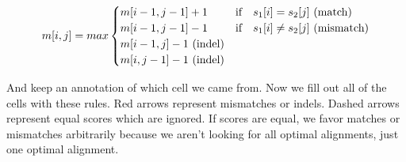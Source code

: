 \documentclass[11pt]{article}
\begin{document}
\begin{equation*}
m[i,j] = max
\begin{cases}
      m[i-1,j-1] + 1 & \text{if \,\, } s_1[i] = s_2[j] \text{ (match)} \\
      m[i-1,j-1] - 1 &  \text{if \,\, } s_1[i] \neq s_2[j] \text{ (mismatch)} \\
      m[i-1,j] - 1 \text{ (indel)} \\
      m[i,j-1] - 1 \text{ (indel)} \\
\end{cases}
\end{equation*}

\noindent
And keep an annotation of which cell we came from. Now we fill out all of the cells with these rules. Red arrows represent mismatches or indels. Dashed arrows represent equal scores which are ignored. If scores are equal, we favor matches or mismatches arbitrarily because we aren't looking for all optimal alignments, just one optimal alignment. \\ \\
\noindent
\end{document}
